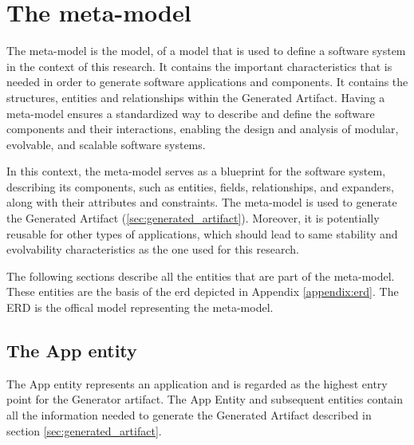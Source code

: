 \section{The meta-model} \label{sec:artifact_meta_model}

The meta-model is the model, of a model that is used to define a software system in the
context of this research. It contains the important characteristics that is needed in
order to generate software applications and components. It contains the structures,
entities and relationships within the Generated Artifact. Having a meta-model ensures a
standardized way to describe and define the software components and their interactions,
enabling the design and analysis of modular, evolvable, and scalable software systems.

In this context, the meta-model serves as a blueprint for the software system, describing
its components, such as entities, fields, relationships, and expanders, along with their
attributes and constraints. The meta-model is used to generate the Generated Artifact
(\ref{sec:generated_artifact}). Moreover, it is potentially reusable for other types of
applications, which should lead to same stability and evolvability characteristics as the
one used for this research. 

The following sections describe all the entities that are part of the meta-model. These
entities are the basis of the \gls{erd} depicted in Appendix \ref{appendix:erd}. The ERD
is the offical model representing the meta-model.

\subsection{The App entity}

The App entity represents an application and is regarded as the highest entry point for the
Generator artifact. The App Entity and subsequent entities contain all the information
needed to generate the Generated Artifact described in section \ref{sec:generated_artifact}. 

